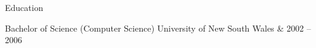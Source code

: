 \documentclass[a4paper,10pt]{article}
\begin{document}

\vspace{3mm}

\begin{resumeblock}{Education}
\begin{resumeentry}
Bachelor of Science (Computer Science)\newline
University of New South Wales & 2002 -- 2006
\end{resumeentry}
\end{resumeblock}
\end{document}
